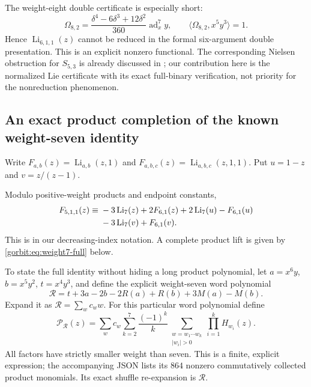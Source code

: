 The weight-eight double certificate is especially short:
\begin{equation}\label{gorbit:eq:omega8}
 \boxed{\quad
 \Omega_{8,2}
 =\frac{\delta^4-6\delta^3+12\delta^2}{360}
       \operatorname{ad}_x^7y,
 \qquad
 \langle\Omega_{8,2},x^5y^3\rangle=1.
 \quad}
\end{equation}
Hence $\operatorname{Li}_{6,1,1}(z)$ cannot be reduced in the formal
six-argument double presentation. This is an explicit nonzero
functional. The corresponding Nielsen obstruction for
$S_{5,3}$ is already discussed in \cite[\S9, preconsiderations]{gorbit:CGR};
our contribution here is the normalized Lie certificate with its exact
full-binary verification, not priority for the nonreduction phenomenon.

\subsection{An exact product completion of the known weight-seven identity}

Write $F_{a,b}(z)=\operatorname{Li}_{a,b}(z,1)$ and
$F_{a,b,c}(z)=\operatorname{Li}_{a,b,c}(z,1,1)$. Put
$u=1-z$ and $v=z/(z-1)$.

\begin{proposition}
\label{gorbit:prop:weight7}
Modulo positive-weight products and endpoint constants,
\begin{align}
 F_{5,1,1}(z)\equiv{}&-3\operatorname{Li}_7(z)+2F_{6,1}(z)
       +2\operatorname{Li}_7(u)-F_{6,1}(u)\notag\\
       &-3\operatorname{Li}_7(v)+F_{6,1}(v).
 \label{gorbit:eq:weight7-congruence}
\end{align}
This is \cite[Proposition~28]{gorbit:CGR} in our decreasing-index
notation. A complete product lift is given by
\eqref{gorbit:eq:weight7-full} below.
\end{proposition}

To state the full identity without hiding a long product polynomial,
let $a=x^6y$, $b=x^5y^2$, $t=x^4y^3$, and define the explicit
weight-seven word polynomial
\begin{equation}\label{gorbit:eq:residual7}
 \mathcal R=t+3a-2b-2R(a)+R(b)+3M(a)-M(b).
\end{equation}
Expand it as $\mathcal R=\sum_w c_w w$. For this particular word
polynomial define
\begin{equation}\label{gorbit:eq:product7}
 \mathcal P_{\mathcal R}(z)
 =\sum_w c_w\sum_{k=2}^{7}\frac{(-1)^k}{k}
       \sum_{\substack{w=w_1\cdots w_k\\|w_i|>0}}
                      \prod_{i=1}^{k}H_{w_i}(z).
\end{equation}
All factors have strictly smaller weight than seven. This is a finite,
explicit expression; the accompanying JSON lists its $864$ nonzero
commutatively collected product monomials. Its exact shuffle
re-expansion is $\mathcal R$.


